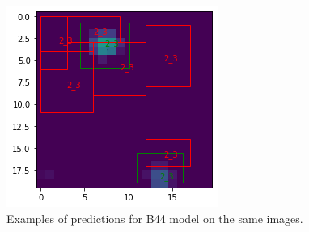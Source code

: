 \documentclass[a4paper,10pt]{report}
\begin{document}
\begin{figure}[!htb]
  \includegraphics[width=\linewidth]{b44_14365_16926_17629_20.png}
  \endminipage\hfill
  \caption{Examples of predictions for B44 model on the same images.}
  \label{fig:b44-pred}
\end{figure}
\end{document}
